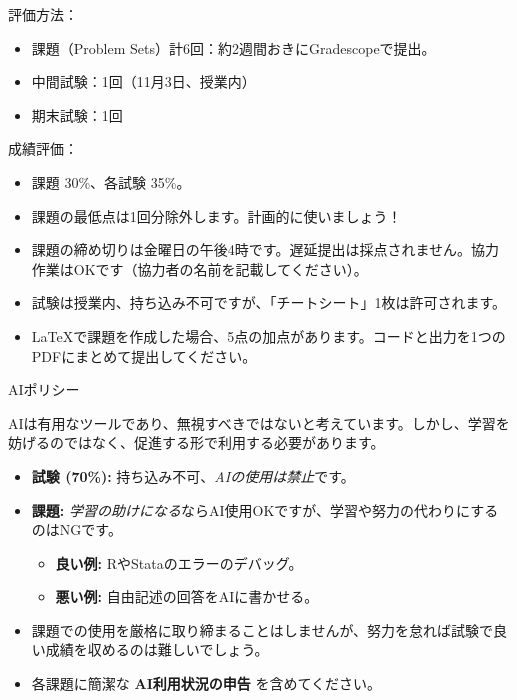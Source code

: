 \documentclass[11pt,handout]{beamer}
\begin{document}
\begin{frame}
\vspace{0.1cm}
評価方法：
\begin{itemize}
\item 課題（Problem Sets）計6回：約2週間おきにGradescopeで提出。
\item 中間試験：1回（11月3日、授業内）
\item 期末試験：1回
\vspace{0.1cm}

\end{itemize}
\vspace{0.2cm}

\pause{}

成績評価：

\begin{itemize}
\item 課題 30\%、各試験 35\%。
\vspace{0.1cm}
\item
 課題の最低点は1回分除外します。計画的に使いましょう！
\vspace{0.1cm}
\item 課題の締め切りは金曜日の午後4時です。遅延提出は採点されません。協力作業はOKです（協力者の名前を記載してください）。
\vspace{0.1cm}
\item 試験は授業内、持ち込み不可ですが、「チートシート」1枚は許可されます。
\vspace{0.1cm}
\item LaTeXで課題を作成した場合、5点の加点があります。コードと出力を1つのPDFにまとめて提出してください。
\end{itemize}
\vspace{0.2cm}

\end{frame}

\begin{frame}{AIポリシー}

AIは有用なツールであり、無視すべきではないと考えています。しかし、学習を妨げるのではなく、促進する形で利用する必要があります。 \medskip
	
	\begin{itemize}
		\item \textbf{試験 (70\%):} 持ち込み不可、\emph{AIの使用は禁止}です。
		\item \textbf{課題:} \emph{学習の助けになる}ならAI使用OKですが、学習や努力の代わりにするのはNGです。
		\begin{itemize}
			\item \textbf{良い例:} RやStataのエラーのデバッグ。
			\item \textbf{悪い例:} 自由記述の回答をAIに書かせる。
		\end{itemize}
		\item 課題での使用を厳格に取り締まることはしませんが、努力を怠れば試験で良い成績を収めるのは難しいでしょう。
		\item 各課題に簡潔な \textbf{AI利用状況の申告} を含めてください。
	\end{itemize}
	
\end{frame}
\end{document}
